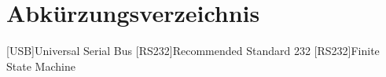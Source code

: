 \section*{Abkürzungsverzeichnis}

\begin{acronym}
    [USB]{Universal Serial Bus}
    [RS232]{Recommended Standard 232}
    [RS232]{Finite State Machine}
\end{acronym}
